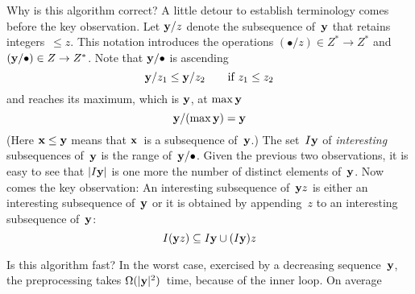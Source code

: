 Why is this algorithm correct?
A little detour to establish terminology comes before the key observation.
Let ${\bf y}/z$ denote the subsequence of~${\bf y}$ that retains integers~$\le z$.
This notation introduces the operations $(\bullet/z)\in Z^*\to Z^*$ and $({\bf y}/\bullet)\in Z\to Z^*$.
Note that ${\bf y}/\bullet$ is ascending
$${\bf y}/z_1\le {\bf y}/z_2 \qquad\hbox{if $z_1\le z_2$}$$
and reaches its maximum, which is ${\bf y}$, at $\max{\bf y}$
$${\bf y}/(\max{\bf y})={\bf y}$$
(Here ${\bf x}\le{\bf y}$ means that ${\bf x}$~is a subsequence of~${\bf y}$.)
The set~$I{\bf y}$ of {\it interesting\/} subsequences of~${\bf y}$ is the range of~${\bf y}/\bullet$.
Given the previous two observations, it is easy to see that $|I{\bf y}|$ is one more the number of distinct elements of~${\bf y}$.
Now comes the key observation:
An interesting subsequence of~${\bf y}z$ is either an interesting subsequence of~${\bf y}$ or it is obtained by appending~$z$ to an interesting subsequence of~${\bf y}$:
$$I({\bf y}z)\subseteq I{\bf y} \cup (I{\bf y})z$$

Is this algorithm fast?
In the worst case, exercised by a decreasing sequence~${\bf y}$, the preprocessing takes $\Omega(|{\bf y}|^2)$~time, because of the inner loop.
On average

\bye
